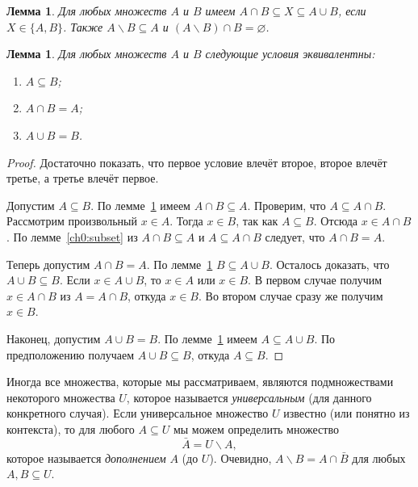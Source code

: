 \documentclass[12pt,notitlepage]{article}
\theoremstyle{plain}
\newtheorem{lemma}[thm]{Лемма}
\theoremstyle{definition}
\theoremstyle{plain}
\newcommand{\sbs}{\subseteq}
\renewcommand{\setminus}{\smallsetminus}
\newcommand{\void}{\varnothing}
\newcommand{\1}{\mathbf{1}}
\newcommand{\0}{\mathbf{0}}
\newcommand{\mcomm}[1]{}
\begin{document}
\begin{lemma}\label{ch0:l3}
	Для любых множеств $A$ и $B$ имеем $A \cap B \sbs X \sbs A \cup B$, если $X \in \{A,B\}$. Также $A \setminus B \sbs A$ и $(A \setminus B) \cap B = \void$.
\end{lemma}
\begin{lemma}\label{ch0:lattice}
	Для любых множеств $A$ и $B$ следующие условия эквивалентны:
	\begin{enumerate}
		\item $A \sbs B$;
		\item $A \cap B = A$;
		\item $A \cup B = B$.
	\end{enumerate}
\end{lemma}
\begin{proof}
	Достаточно показать, что первое условие влечёт второе, второе влечёт третье, а третье влечёт первое.
	
	Допустим $A \sbs B$. По лемме~\ref{ch0:l3} имеем $A \cap B \sbs A$. Проверим, что $A \sbs A \cap B$. Рассмотрим произвольный $x \in A$. Тогда $x \in B$, так как $A \sbs B$. Отсюда $x \in A \cap B$. По лемме~\ref{ch0:subset} из $A \cap B \sbs A$ и $A \sbs A \cap B$ следует, что $A \cap B = A$.
	
	Теперь допустим $A \cap B = A$. По лемме~\ref{ch0:l3} $B \sbs A \cup B$. Осталось доказать, что $A \cup B \sbs B$. Если $x \in A \cup B$, то $x \in A$ или $x \in B$. В первом случае получим $x \in A \cap B$ из $A = A \cap B$, откуда $x \in B$. Во втором случае сразу же получим $x \in B$.
	
	Наконец, допустим $A \cup B = B$. По лемме~\ref{ch0:l3} имеем $A \sbs A \cup B$. По предположению получаем $A \cup B \sbs B$, откуда $A \sbs B$.
\end{proof}

Иногда все множества, которые мы рассматриваем, являются подмножествами некоторого множества $U$, которое называется \emph{универсальным} (для данного конкретного случая). Если универсальное множество $U$ известно (или понятно из контекста), то для любого $A \sbs U$ мы можем определить множество
$$\bar A = U \setminus A,$$
которое называется \emph{дополнением} $A$ (до $U$). Очевидно, $A \setminus B = A \cap \bar B$ для любых $A, B \sbs U$.

\mcomm{Some students mistake this `universe' for ``the set of all sets''. The Instructor should discourage this misconception.}
\end{document}
